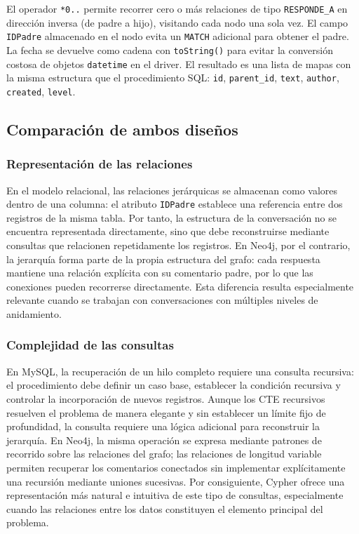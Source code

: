 \documentclass[11pt, a4paper]{article}
\begin{document}
El operador \texttt{*0..} permite recorrer cero o más relaciones de tipo \texttt{RESPONDE\_A} en dirección inversa (de padre a hijo), visitando cada nodo una sola vez. El campo \texttt{IDPadre} almacenado en el nodo evita un \texttt{MATCH} adicional para obtener el padre. La fecha se devuelve como cadena con \texttt{toString()} para evitar la conversión costosa de objetos \texttt{datetime} en el driver. El resultado es una lista de mapas con la misma estructura que el procedimiento SQL: \texttt{id}, \texttt{parent\_id}, \texttt{text}, \texttt{author}, \texttt{created}, \texttt{level}.

\subsection{Comparación de ambos diseños}

\subsubsection{Representación de las relaciones}
En el modelo relacional, las relaciones jerárquicas se almacenan como valores dentro de una columna: el atributo \texttt{IDPadre} establece una referencia entre dos registros de la misma tabla. Por tanto, la estructura de la conversación no se encuentra representada directamente, sino que debe reconstruirse mediante consultas que relacionen repetidamente los registros. En Neo4j, por el contrario, la jerarquía forma parte de la propia estructura del grafo: cada respuesta mantiene una relación explícita con su comentario padre, por lo que las conexiones pueden recorrerse directamente. Esta diferencia resulta especialmente relevante cuando se trabajan con conversaciones con múltiples niveles de anidamiento.

\subsubsection{Complejidad de las consultas}
En MySQL, la recuperación de un hilo completo requiere una consulta recursiva: el procedimiento debe definir un caso base, establecer la condición recursiva y controlar la incorporación de nuevos registros. Aunque los CTE recursivos resuelven el problema de manera elegante y sin establecer un límite fijo de profundidad, la consulta requiere una lógica adicional para reconstruir la jerarquía. En Neo4j, la misma operación se expresa mediante patrones de recorrido sobre las relaciones del grafo; las relaciones de longitud variable permiten recuperar los comentarios conectados sin implementar explícitamente una recursión mediante uniones sucesivas. Por consiguiente, Cypher ofrece una representación más natural e intuitiva de este tipo de consultas, especialmente cuando las relaciones entre los datos constituyen el elemento principal del problema.
\end{document}
